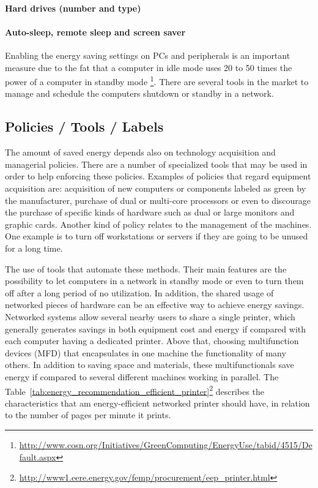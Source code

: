             \paragraph*{Hard drives (number and type)}%
            \paragraph*{Auto-sleep, remote sleep and screen saver} Enabling the energy saving settings on PCs and peripherals is an important measure due to the fat that a computer in idle mode uses 20 to 50 times the power of a computer in standby mode
\footnote{\url{http://www.cosn.org/Initiatives/GreenComputing/EnergyUse/tabid/4515/Default.aspx}}.
There are several tools in the market to manage and schedule the computers shutdown or standby in a network.

    \subsection{Policies / Tools / Labels} \label{sec2:policies_tools_labels}
        The amount of saved energy depends also on technology acquisition and managerial policies. There are a number of specialized tools that may be used in order to help enforcing these policies. Examples of policies that regard equipment acquisition are: acquisition of new computers or components labeled as green by the manufacturer, purchase of dual or multi-core processors or even to discourage the purchase of specific kinds of hardware such as dual or large monitors and graphic cards. Another kind of policy relates to the management of the machines. One example is to turn off workstations or servers if they are going to be unused for a long time.
        

        The use of tools that automate these methods. Their main features are the possibility to let computers in a network in standby mode or even to turn them off after a long period of no utilization. In addition, the shared usage of networked pieces of hardware can be an effective way to achieve energy savings. Networked systems allow several nearby users to share a single printer, which generally generates savings in both equipment cost and energy if compared with each computer having a dedicated printer. Above that, choosing multifunction devices (MFD) that encapsulates in one machine the functionality of many others. In addition to saving space and materials, these multifunctionals save energy if compared to several different machines working in parallel. The Table~\ref{tab:energy_recommendation_efficient_printer}\footnote{\url{http://www1.eere.energy.gov/femp/procurement/eep_printer.html}} describes the characteristics that am energy-efficient networked printer should have, in relation to the number of pages per minute it prints. 
        

